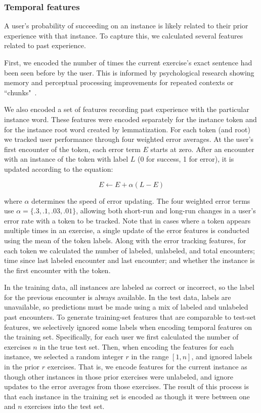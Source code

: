 \documentclass[11pt,a4paper]{article}
\begin{document}
\subsubsection{Temporal features}

A user's probability of succeeding on an instance is likely related to their
prior experience with that instance. To capture this, we calculated several
features related to past experience. 

First, we encoded the number of times the
current exercise's exact sentence had been seen before by the user. This is
informed by psychological research showing memory and perceptual processing
improvements for repeated contexts or ``chunks"~\cite[e.g.,][]{Chun:1999gt}. 

We also encoded a set of features recording past experience with
the particular instance word. These features were encoded separately for the
instance token and for the instance root word created by lemmatization.
For each token (and root) we tracked user performance through four weighted
error averages. At the user's first encounter of the token, each error term $E$ starts at
zero. After an encounter with an instance of the token with label $L$ (0 for
success, 1 for error), it is
updated according to the equation:

\[
E \leftarrow E + \alpha (L - E)
\]

where $\alpha$ determines the speed of error updating. The four weighted
error terms use $\alpha = \{.3, .1, .03, .01\}$, allowing both short-run and
long-run changes in a user's error rate with a token to be tracked. Note that in
cases where a token appears multiple times in an exercise, a single update of
the error features is conducted using the mean of the token labels.
Along with the error tracking features, for each token we calculated the number
of labeled, unlabeled, and total encounters; time since last labeled encounter and
last encounter; and whether the instance is the first encounter with the
token.

In the training data, all instances are labeled as correct or incorrect, so the
label for the previous encounter is always available. In the test data, labels
are unavailable, so predictions must be made using a mix of labeled and
unlabeled past encounters. To generate training-set features that are 
comparable to test-set features, we selectively ignored some labels when encoding temporal features on
the training set. Specifically, for each user we first calculated the number of
exercises $n$ in the true test set. Then, when encoding the features for each
instance, we selected a random integer $r$ in the range $[1,n]$, and ignored labels
in the prior $r$ exercises. That is, we encode features for the current instance
as though other instances in those prior exercises were unlabeled, and ignore
updates to the error averages from those exercises. The result of this process
is that each instance in the training set is encoded as though it were between
one and $n$ exercises into the test set.
\end{document}
